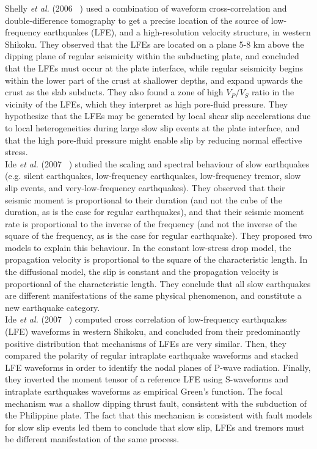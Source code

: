 \documentclass[main.tex]{subfiles}
\begin{document}
Shelly \textit{et al.} (2006 ~\cite{SHE_2006}) used a combination of waveform cross-correlation and double-difference tomography to get a precise location of the source of low-frequency earthquakes (LFE), and a high-resolution velocity structure, in western Shikoku. They observed that the LFEs are located on a plane 5-8 km above the dipping plane of regular seismicity within the subducting plate, and concluded that the LFEs must occur at the plate interface, while regular seismicity begins within the lower part of the crust at shallower depths, and expand upwards the crust as the slab subducts. They also found a zone of high $V_P / V_S$ ratio in the vicinity of the LFEs, which they interpret as high pore-fluid pressure. They hypothesize that the LFEs may be generated by local shear slip accelerations due to local heterogeneities during large slow slip events at the plate interface, and that the high pore-fluid pressure might enable slip by reducing normal effective stress. \\

Ide \textit{et al.} (2007 ~\cite{IDE_2007_nature}) studied the scaling and spectral behaviour of slow earthquakes (e.g. silent earthquakes, low-frequency earthquakes, low-frequency tremor, slow slip events, and very-low-frequency earthquakes). They observed that their seismic moment is proportional to their duration (and not the cube of the duration, as is the case for regular earthquakes), and that their seismic moment rate is proportional to the inverse of the frequency (and not the inverse of the square of the frequency, as is the case for regular earthquake). They proposed two models to explain this behaviour. In the constant low-stress drop model, the propagation velocity is proportional to the square of the characteristic length. In the diffusional model, the slip is constant and the propagation velocity is proportional of the characteristic length. They conclude that all slow earthquakes are different manifestations of the same physical phenomenon, and constitute a new earthquake category. \\

Ide \textit{et al.} (2007 ~\cite{IDE_2007_GRL}) computed cross correlation of low-frequency earthquakes (LFE) waveforms in western Shikoku, and concluded from their predominantly positive distribution that mechanisms of LFEs are very similar. Then, they compared the polarity of regular intraplate earthquake waveforms and stacked LFE waveforms in order to identify the nodal planes of P-wave radiation. Finally, they inverted the moment tensor of a reference LFE using S-waveforms and intraplate earthquakes waveforms as empirical Green's function. The focal mechanism was a shallow dipping thrust fault, consistent with the subduction of the Philippine plate. The fact that this mechanism is consistent with fault models for slow slip events led them to conclude that slow slip, LFEs and tremors must be different manifestation of the same process. \\
\end{document}
